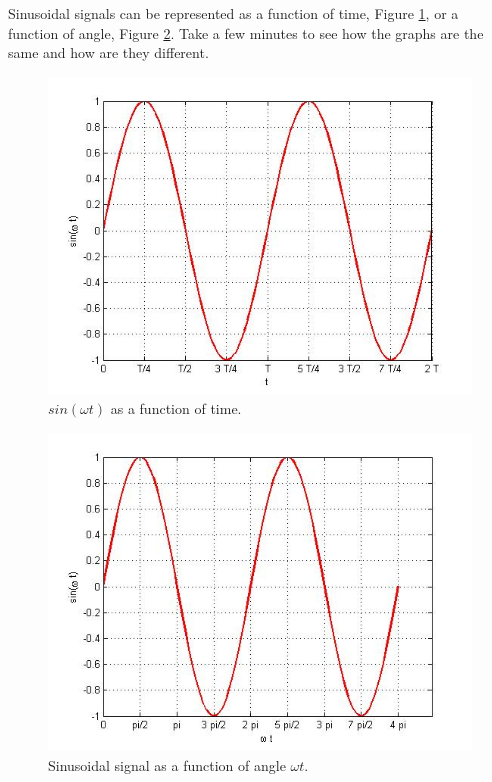 \documentclass{ximera}
\begin{document}
\begin{definition}
Sinusoidal signals can be represented as a function of time, Figure \ref{sin}, or a function of angle, Figure \ref{sinPh}. Take a few minutes to see how the graphs are the same and how are they different.



\begin{figure}[htpb]
\includegraphics[scale=0.4]{jpg/cpef1.jpg}
\caption{$sin ( \omega t)$ as a function of time.} \label{sin}
\end{figure}




\begin{figure}[htpb]
\includegraphics[scale=0.4]{jpg/cpef3.jpg}
\caption{Sinusoidal signal as a function of angle $\omega t$.}
\label{sinPh}
\end{figure}

\end{definition}
\end{document}
